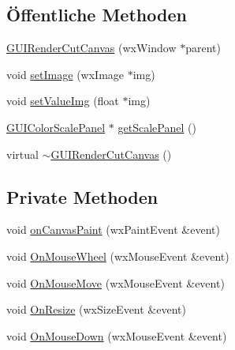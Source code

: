 \subsection*{Öffentliche Methoden}
\begin{DoxyCompactItemize}
\item 
\hyperlink{classGUIRenderCutCanvas_aa61de910b5041f7384def30e55b0817e}{G\-U\-I\-Render\-Cut\-Canvas} (wx\-Window $\ast$parent)
\item 
void \hyperlink{classGUIRenderCutCanvas_ab20c8e437704facc41fa8c3c111ffa85}{set\-Image} (wx\-Image $\ast$img)
\item 
void \hyperlink{classGUIRenderCutCanvas_a88c49bc069d6e1a40b68dcfce8fd9bf7}{set\-Value\-Img} (float $\ast$img)
\item 
\hyperlink{classGUIColorScalePanel}{G\-U\-I\-Color\-Scale\-Panel} $\ast$ \hyperlink{classGUIRenderCutCanvas_a3f1bece4366e82377ec3754921351929}{get\-Scale\-Panel} ()
\item 
virtual \hyperlink{classGUIRenderCutCanvas_a015523000fb4d5d9a5319115d8c3d9bb}{$\sim$\-G\-U\-I\-Render\-Cut\-Canvas} ()
\end{DoxyCompactItemize}
\subsection*{Private Methoden}
\begin{DoxyCompactItemize}
\item 
void \hyperlink{classGUIRenderCutCanvas_a348424f671910f6ede43cb6835852589}{on\-Canvas\-Paint} (wx\-Paint\-Event \&event)
\item 
void \hyperlink{classGUIRenderCutCanvas_a6759782fb854d7be47f368974c57b4e1}{On\-Mouse\-Wheel} (wx\-Mouse\-Event \&event)
\item 
void \hyperlink{classGUIRenderCutCanvas_a5d4aa229d86929fe6f6a73fe05ab32ad}{On\-Mouse\-Move} (wx\-Mouse\-Event \&event)
\item 
void \hyperlink{classGUIRenderCutCanvas_a60ff460dd2c800b71802133f56d5b355}{On\-Resize} (wx\-Size\-Event \&event)
\item 
void \hyperlink{classGUIRenderCutCanvas_a42f81a939b256a87e76b3896fc0b9ce3}{On\-Mouse\-Down} (wx\-Mouse\-Event \&event)
\end{DoxyCompactItemize}
